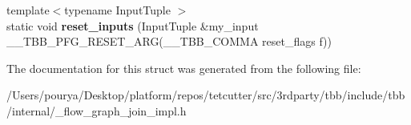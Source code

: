 \begin{DoxyCompactItemize}
\item 
\hypertarget{structinternal_1_1join__helper_3_011_01_4_abf3e2d0bda931ec5410b943569b6ec04}{}{\footnotesize template$<$typename Input\+Tuple $>$ }\\static void {\bfseries reset\+\_\+inputs} (Input\+Tuple \&my\+\_\+input \+\_\+\+\_\+\+T\+B\+B\+\_\+\+P\+F\+G\+\_\+\+R\+E\+S\+E\+T\+\_\+\+A\+R\+G(\+\_\+\+\_\+\+T\+B\+B\+\_\+\+C\+O\+M\+M\+A reset\+\_\+flags f))\label{structinternal_1_1join__helper_3_011_01_4_abf3e2d0bda931ec5410b943569b6ec04}

\end{DoxyCompactItemize}


The documentation for this struct was generated from the following file\+:\begin{DoxyCompactItemize}
\item 
/\+Users/pourya/\+Desktop/platform/repos/tetcutter/src/3rdparty/tbb/include/tbb/internal/\+\_\+flow\+\_\+graph\+\_\+join\+\_\+impl.\+h\end{DoxyCompactItemize}
